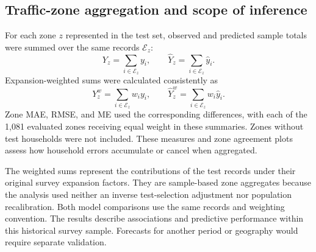 \subsection{Traffic-zone aggregation and scope of inference}
For each zone $z$ represented in the test set, observed and predicted sample totals were summed over the same records $\mathcal E_z$:
\begin{equation}
 Y_z=\sum_{i\in\mathcal E_z}y_i,
 \qquad \widehat Y_z=\sum_{i\in\mathcal E_z}\widehat y_i.
\end{equation}
Expansion-weighted sums were calculated consistently as
\begin{equation}
 Y_z^{w}=\sum_{i\in\mathcal E_z}w_i y_i,
 \qquad \widehat Y_z^{w}=\sum_{i\in\mathcal E_z}w_i\widehat y_i.
\end{equation}
Zone MAE, RMSE, and ME used the corresponding differences, with each of the 1,081 evaluated zones receiving equal weight in these summaries. Zones without test households were not included. These measures and zone agreement plots assess how household errors accumulate or cancel when aggregated.

The weighted sums represent the contributions of the test records under their original survey expansion factors. They are sample-based zone aggregates because the analysis used neither an inverse test-selection adjustment nor population recalibration. Both model comparisons use the same records and weighting convention. The results describe associations and predictive performance within this historical survey sample. Forecasts for another period or geography would require separate validation.
